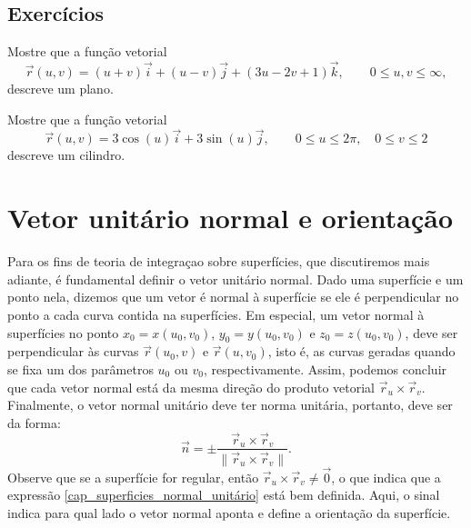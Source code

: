  \subsection*{Exercícios}
 \begin{exer}Mostre que a função vetorial
  $$
  \vec{r}(u,v)=(u+v)\vec{i}+(u-v)\vec{j}+(3u-2v+1)\vec{k}, \qquad 0\leq u,v\leq \infty,
  $$
  descreve um plano.
 \end{exer}

 \begin{exer}Mostre que a função vetorial
  $$
  \vec{r}(u,v)=3\cos(u)\vec{i}+3\sin(u)\vec{j}, \qquad 0\leq u\leq 2\pi,\quad 0\leq v\leq 2
  $$
  descreve um cilindro.
 \end{exer}
 
 
\section{Vetor unitário normal e orientação}
Para os fins de teoria de integraçao sobre superfícies, que discutiremos mais adiante, é fundamental definir o vetor unitário normal. Dado uma superfície e um ponto nela, dizemos que um vetor é normal à superfície se ele é perpendicular no ponto a cada curva contida na superfícies. Em especial, um vetor normal à superfícies no ponto $x_0=x(u_0,v_0)$, $y_0=y(u_0,v_0)$ e $z_0=z(u_0,v_0)$, deve ser perpendicular às curvas $\vec{r}(u_0,v)$ e $\vec{r}(u,v_0)$, isto é, as curvas geradas quando se fixa um dos parâmetros $u_0$ ou $v_0$, respectivamente. Assim, podemos concluir que cada vetor normal está da mesma direção do produto vetorial $\vec{r}_u\times\vec{r}_v$. Finalmente, o vetor normal unitário deve ter norma unitária, portanto, deve ser da forma:
\begin{equation}\label{cap_superficies_normal_unitário}
 \vec{n} = \pm \frac{\vec{r}_u\times\vec{r}_v}{\|\vec{r}_u\times\vec{r}_v\|}.
\end{equation}
Observe que se a superfície for regular, então $\vec{r}_u\times\vec{r}_v\neq \vec{0}$, o que indica que a expressão \eqref{cap_superficies_normal_unitário} está bem definida. Aqui, o sinal indica para qual lado o vetor normal aponta e define a orientação da superfície. 

